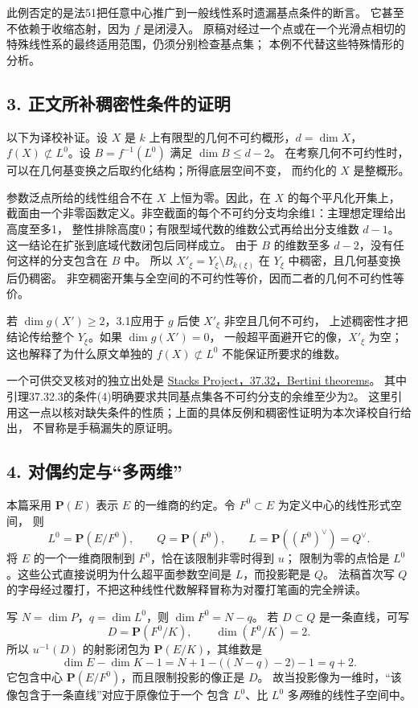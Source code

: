 此例否定的是法51把任意中心推广到一般线性系时遗漏基点条件的断言。
它甚至不依赖于收缩态射，因为 $f$ 是闭浸入。
原稿对经过一个点或在一个光滑点相切的特殊线性系的最终适用范围，仍须分别检查基点集；
本例不代替这些特殊情形的分析。

\subsection*{3. 正文所补稠密性条件的证明}

以下为译校补证。设 $X$ 是 $k$ 上有限型的几何不可约概形，$d=\dim X$，
$f(X)\not\subset L^0$。设 $B=f^{-1}(L^0)$ 满足 $\dim B\le d-2$。
在考察几何不可约性时，可以在几何基变换之后取约化结构；所得底层空间不变，
而约化的 $X$ 是整概形。

参数泛点所给的线性组合不在 $X$ 上恒为零。因此，在 $X$ 的每个平凡化开集上，
截面由一个非零函数定义。非空截面的每个不可约分支均余维1：主理想定理给出高度至多1，
整性排除高度0；有限型域代数的维数公式再给出分支维数 $d-1$。
这一结论在扩张到底域代数闭包后同样成立。
由于 $B$ 的维数至多 $d-2$，没有任何这样的分支包含在 $B$ 中。
所以 $X'_\xi=Y_\xi\setminus B_{k(\xi)}$ 在 $Y_\xi$ 中稠密，且几何基变换后仍稠密。
非空稠密开集与全空间的不可约性等价，因而二者的几何不可约性等价。

若 $\dim g(X')\ge2$，3.1应用于 $g$ 后使 $X'_\xi$ 非空且几何不可约，
上述稠密性才把结论传给整个 $Y_\xi$。如果 $\dim g(X')=0$，
一般超平面避开它的像，$X'_\xi$ 为空；这也解释了为什么原文单独的
$f(X)\not\subset L^0$ 不能保证所要求的维数。

一个可供交叉核对的独立出处是
\href{https://stacks.math.columbia.edu/tag/0G4C}{Stacks Project，37.32，Bertini theorems}。
其中引理37.32.3的条件(4)明确要求共同基点集各不可约分支的余维至少为2。
这里引用这一点以核对缺失条件的性质；上面的具体反例和稠密性证明为本次译校自行给出，
不冒称是手稿漏失的原证明。

\subsection*{4. 对偶约定与“多两维”}

本篇采用 $\mathbf P(E)$ 表示 $E$ 的一维商的约定。令 $F^0\subset E$ 为定义中心的线性形式空间，
则
\[
 L^0=\mathbf P(E/F^0),\qquad Q=\mathbf P(F^0),\qquad
 L=\mathbf P((F^0)^\vee)=Q^\vee.
\]
将 $E$ 的一个一维商限制到 $F^0$，恰在该限制非零时得到 $u$；
限制为零的点恰是 $L^0$。这些公式直接说明为什么超平面参数空间是 $L$，而投影靶是 $Q$。
法稿首次写 $Q$ 的字母经过覆打，不把这种线性代数解释冒称为对覆打笔画的完全辨读。

写 $N=\dim P$，$q=\dim L^0$，则 $\dim F^0=N-q$。
若 $D\subset Q$ 是一条直线，可写
\[
 D=\mathbf P(F^0/K),\qquad \dim(F^0/K)=2.
\]
所以 $u^{-1}(D)$ 的射影闭包为 $\mathbf P(E/K)$，其维数是
\[
 \dim E-\dim K-1
 =N+1-\bigl((N-q)-2\bigr)-1=q+2.
\]
它包含中心 $\mathbf P(E/F^0)$，而且限制投影的像正是 $D$。
故当投影像为一维时，“该像包含于一条直线”对应于原像位于一个
包含 $L^0$、比 $L^0$ 多\emph{两}维的线性子空间中。

